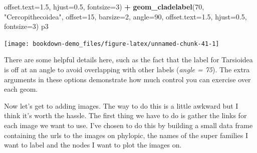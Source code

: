 \documentclass[
]{book}
\newenvironment{Shaded}{\begin{snugshade}}{\end{snugshade}}
\newcommand{\DataTypeTok}[1]{\textcolor[rgb]{0.13,0.29,0.53}{#1}}
\newcommand{\DecValTok}[1]{\textcolor[rgb]{0.00,0.00,0.81}{#1}}
\newcommand{\FloatTok}[1]{\textcolor[rgb]{0.00,0.00,0.81}{#1}}
\newcommand{\KeywordTok}[1]{\textcolor[rgb]{0.13,0.29,0.53}{\textbf{#1}}}
\newcommand{\NormalTok}[1]{#1}
\newcommand{\OperatorTok}[1]{\textcolor[rgb]{0.81,0.36,0.00}{\textbf{#1}}}
\newcommand{\StringTok}[1]{\textcolor[rgb]{0.31,0.60,0.02}{#1}}
\begin{document}
\begin{Shaded}
\begin{Highlighting}[]
                  \DataTypeTok{offset.text=}\FloatTok{1.5}\NormalTok{, }\DataTypeTok{hjust=}\FloatTok{0.5}\NormalTok{, }\DataTypeTok{fontsize=}\DecValTok{3}\NormalTok{) }\OperatorTok{+}
\StringTok{  }\KeywordTok{geom\_cladelabel}\NormalTok{(}\DecValTok{70}\NormalTok{, }\StringTok{"Cercopithecoidea"}\NormalTok{, }\DataTypeTok{offset=}\DecValTok{15}\NormalTok{, }\DataTypeTok{barsize=}\DecValTok{2}\NormalTok{, }\DataTypeTok{angle=}\DecValTok{90}\NormalTok{,}
                  \DataTypeTok{offset.text=}\FloatTok{1.5}\NormalTok{, }\DataTypeTok{hjust=}\FloatTok{0.5}\NormalTok{, }\DataTypeTok{fontsize=}\DecValTok{3}\NormalTok{)}
\NormalTok{p3}
\end{Highlighting}
\end{Shaded}

\begin{center}\texttt{[image: bookdown-demo\_files/figure-latex/unnamed-chunk-41-1]} \end{center}

There are some helpful details here, such as the fact that the label for Tarsioidea is off at an angle to avoid overlapping with other labels (\emph{angle = 75}). The extra arguments in these options demonstrate how much control you can exercise over each geom.

Now let's get to adding images. The way to do this is a little awkward but I think it's worth the hassle. The first thing we have to do is gather the links for each image we want to use. I've chosen to do this by building a small data frame containing the urls to the images on phylopic, the names of the super families I want to label and the nodes I want to plot the images on.
\end{document}
